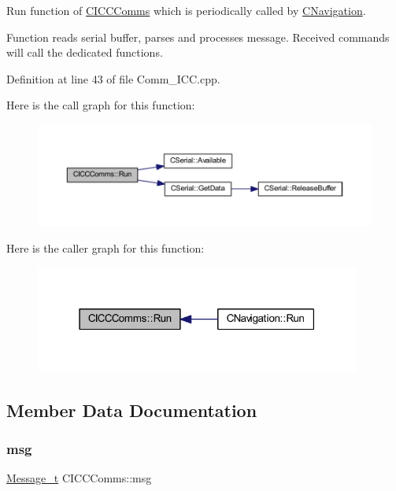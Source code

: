 Run function of \mbox{\hyperlink{class_c_i_c_c_comms}{C\+I\+C\+C\+Comms}} which is periodically called by \mbox{\hyperlink{class_c_navigation}{C\+Navigation}}. 

Function reads serial buffer, parses and processes message. Received commands will call the dedicated functions. 

Definition at line 43 of file Comm\+\_\+\+I\+C\+C.\+cpp.

Here is the call graph for this function\+:
\nopagebreak
\begin{figure}[H]
\begin{center}
\leavevmode
\includegraphics[width=350pt]{class_c_i_c_c_comms_a8b3fa81307b3b9ba0e72b4aee8279c56_cgraph}
\end{center}
\end{figure}
Here is the caller graph for this function\+:
\nopagebreak
\begin{figure}[H]
\begin{center}
\leavevmode
\includegraphics[width=303pt]{class_c_i_c_c_comms_a8b3fa81307b3b9ba0e72b4aee8279c56_icgraph}
\end{center}
\end{figure}


\subsection{Member Data Documentation}
\mbox{\label{class_c_i_c_c_comms_a35a59d11110d830b70ab5e2a5644bbb9}} 
\subsubsection{\texorpdfstring{msg}{msg}}
{\footnotesize\ttfamily \mbox{\hyperlink{struct_c_i_c_c_comms_1_1_message__t}{Message\+\_\+t}} C\+I\+C\+C\+Comms\+::msg}



